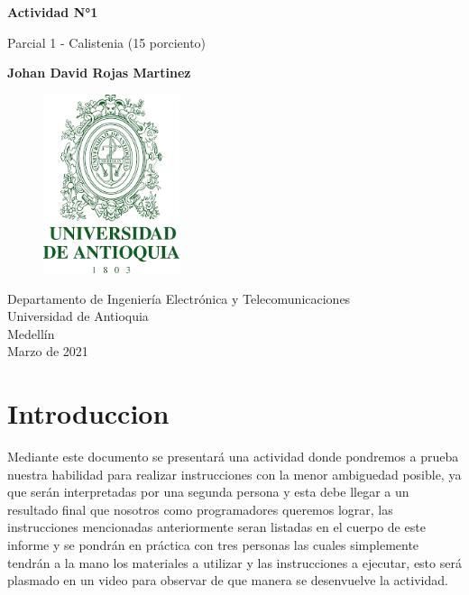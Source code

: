 \documentclass{article}
\begin{document}
\begin{titlepage}
    \begin{center}
        \vspace*{1cm}
            
        \Huge
        \textbf{Actividad N°1}
            
        \vspace{0.5cm}
        \LARGE
        Parcial 1 - Calistenia (15 porciento)
            
        \vspace{1.5cm}
            
        \textbf{Johan David Rojas Martinez}
            
        \vfill
            
        \vspace{0.8cm}
       
        \Large
\begin{figure}[h]
\includegraphics[width=4cm]{logoudea.png}
\centering
\end{figure}

        \vfill
        Departamento de Ingeniería Electrónica y Telecomunicaciones\\
        Universidad de Antioquia\\
        Medellín\\
        Marzo de 2021
                 
    \end{center}
\end{titlepage}

\tableofcontents

\section{Introduccion}
\noindent
Mediante este documento se presentará una actividad donde pondremos a prueba nuestra habilidad para realizar instrucciones con la menor ambiguedad posible, ya que serán interpretadas por una segunda persona y esta debe llegar a un resultado final que nosotros como programadores queremos lograr, las instrucciones mencionadas anteriormente seran listadas en el cuerpo de este informe y se pondrán en práctica con tres personas las cuales simplemente tendrán a la mano los materiales a utilizar y las instrucciones a ejecutar, esto será plasmado en un video para observar de que manera se desenvuelve la actividad.
\end{document}
